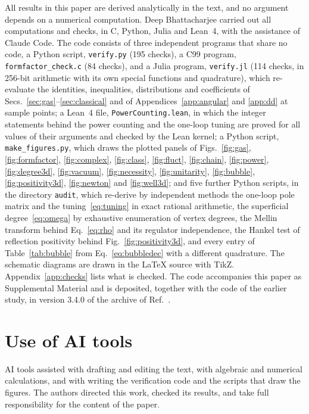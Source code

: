 \documentclass[aps,prd,10pt,twocolumn,superscriptaddress,nofootinbib,floatfix,longbibliography]{revtex4-2}
\begin{document}
All results in this paper are derived analytically in the text, and no argument depends on a numerical computation. Deep Bhattacharjee carried out all computations and checks, in C, Python, Julia and Lean~4, with the assistance of Claude Code. The code consists of three independent programs that share no code, a Python script, \texttt{verify.py} (195 checks), a C99 program, \texttt{formfactor\_check.c} (84 checks), and a Julia program, \texttt{verify.jl} (114 checks, in 256-bit arithmetic with its own special functions and quadrature), which re-evaluate the identities, inequalities, distributions and coefficients of Secs.~\ref{sec:gas}--\ref{sec:classical} and of Appendices~\ref{app:angular} and \ref{app:dd} at sample points; a Lean~4 file, \texttt{PowerCounting.lean}, in which the integer statements behind the power counting and the one-loop tuning are proved for all values of their arguments and checked by the Lean kernel; a Python script, \texttt{make\_figures.py}, which draws the plotted panels of Figs.~\ref{fig:gas}, \ref{fig:formfactor}, \ref{fig:complex}, \ref{fig:class}, \ref{fig:fluct}, \ref{fig:chain}, \ref{fig:power}, \ref{fig:degree3d}, \ref{fig:vacuum}, \ref{fig:necessity}, \ref{fig:unitarity}, \ref{fig:bubble}, \ref{fig:positivity3d}, \ref{fig:newton} and \ref{fig:well3d}; and five further Python scripts, in the directory \texttt{audit}, which re-derive by independent methods the one-loop pole matrix and the tuning~\eqref{eq:tuning} in exact rational arithmetic, the superficial degree~\eqref{eq:omega} by exhaustive enumeration of vertex degrees, the Mellin transform behind Eq.~\eqref{eq:rho} and its regulator independence, the Hankel test of reflection positivity behind Fig.~\ref{fig:positivity3d}, and every entry of Table~\ref{tab:bubble} from Eq.~\eqref{eq:bubbledec} with a different quadrature. The schematic diagrams are drawn in the \LaTeX{} source with TikZ. Appendix~\ref{app:checks} lists what is checked. The code accompanies this paper as Supplemental Material and is deposited, together with the code of the earlier study, in version 3.4.0 of the archive of Ref.~\cite{Bhattacharjee2026}.

\section*{Use of AI tools}

AI tools assisted with drafting and editing the text, with algebraic and numerical calculations, and with writing the verification code and the scripts that draw the figures. The authors directed this work, checked its results, and take full responsibility for the content of the paper.
\end{document}
